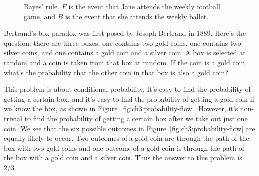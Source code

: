 \begin{figure}[H]
\caption{Bayes' rule. $F$ is the event that Jane attends the weekly football
game, and $B$ is the event that she attends the weekly ballet.}
\label{fig:ch3:bayes-rule}
\end{figure}

\begin{example}
Bertrand's box paradox was first posed by Joseph Bertrand in 1889. Here's the
question: there are three boxes, one contains two gold coins, one contains two
silver coins, and one contains a gold coin and a silver coin.
A box is selected at random and a coin is taken from that box at random. If the
coin is a gold coin, what's the probability that the other coin in that box is
also a gold coin?
\end{example}

This problem is about conditional probability. It's easy to find the
probability of getting a certain box, and it's easy to find the probability of
getting a gold coin if we know the box, as shown in
Figure~\ref{fig:ch3:probability-flow}. However, it's non-trivial to find the
probability of getting a certain box after we take out just one coin.
We see that the six
possible outcomes in Figure~\ref{fig:ch3:probability-flow} are equally likely to
occur. Two outcomes of a gold coin are through the path of the box with two gold
coins and one outcome of a gold coin is through the path of the box with a gold
coin and a silver coin. Thus the answer to this problem is 2/3.

